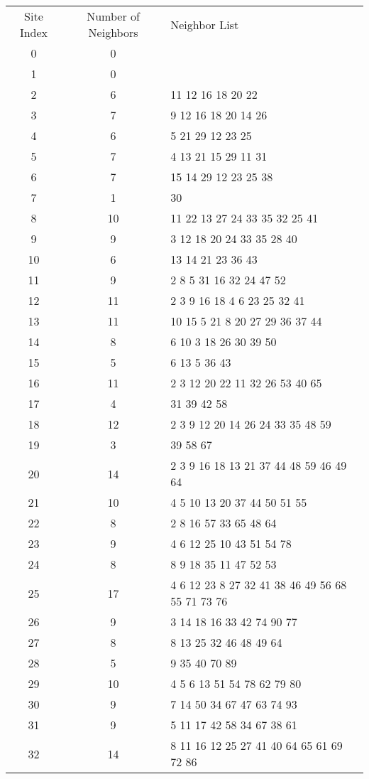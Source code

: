 \documentclass{standalone}
\begin{document}
\begin{tabular}{c c l}Site Index & Number of Neighbors & Neighbor List \\
0 & 0 &  \\
1 & 0 &  \\
2 & 6 & 11 12 16 18 20 22 \\
3 & 7 & 9 12 16 18 20 14 26 \\
4 & 6 & 5 21 29 12 23 25 \\
5 & 7 & 4 13 21 15 29 11 31 \\
6 & 7 & 15 14 29 12 23 25 38 \\
7 & 1 & 30 \\
8 & 10 & 11 22 13 27 24 33 35 32 25 41 \\
9 & 9 & 3 12 18 20 24 33 35 28 40 \\
10 & 6 & 13 14 21 23 36 43 \\
11 & 9 & 2 8 5 31 16 32 24 47 52 \\
12 & 11 & 2 3 9 16 18 4 6 23 25 32 41 \\
13 & 11 & 10 15 5 21 8 20 27 29 36 37 44 \\
14 & 8 & 6 10 3 18 26 30 39 50 \\
15 & 5 & 6 13 5 36 43 \\
16 & 11 & 2 3 12 20 22 11 32 26 53 40 65 \\
17 & 4 & 31 39 42 58 \\
18 & 12 & 2 3 9 12 20 14 26 24 33 35 48 59 \\
19 & 3 & 39 58 67 \\
20 & 14 & 2 3 9 16 18 13 21 37 44 48 59 46 49 64 \\
21 & 10 & 4 5 10 13 20 37 44 50 51 55 \\
22 & 8 & 2 8 16 57 33 65 48 64 \\
23 & 9 & 4 6 12 25 10 43 51 54 78 \\
24 & 8 & 8 9 18 35 11 47 52 53 \\
25 & 17 & 4 6 12 23 8 27 32 41 38 46 49 56 68 55 71 73 76 \\
26 & 9 & 3 14 18 16 33 42 74 90 77 \\
27 & 8 & 8 13 25 32 46 48 49 64 \\
28 & 5 & 9 35 40 70 89 \\
29 & 10 & 4 5 6 13 51 54 78 62 79 80 \\
30 & 9 & 7 14 50 34 67 47 63 74 93 \\
31 & 9 & 5 11 17 42 58 34 67 38 61 \\
32 & 14 & 8 11 16 12 25 27 41 40 64 65 61 69 72 86 \\

\end{tabular}
\end{document}
